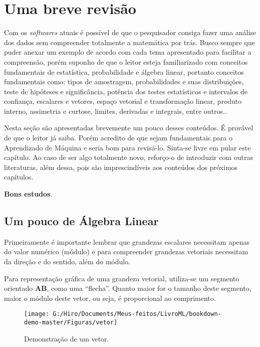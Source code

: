 \documentclass[
  openany]{book}
\begin{document}
\hypertarget{dicio}{%
\chapter{Uma breve revisão}\label{dicio}}

Com os \emph{softwares} atuais é possível de que o pesquisador consiga fazer uma análise dos dados sem compreender totalmente a matemática por trás. Busco sempre que puder anexar um exemplo de acordo com cada tema apresentado para facilitar a compreensão, porém suponho de que o leitor esteja familiarizado com conceitos fundamentais de estatística, probabilidade e álgebra linear, portanto conceitos fundamentais como: tipos de amostragem, probabilidades e suas distribuições, teste de hipóteses e significância, potência dos testes estatísticos e intervalos de confiança, escalares e vetores, espaço vetorial e transformação linear, produto interno, assimetria e curtose, limites, derivadas e integrais, entre outros..

Nesta seção são apresentadas brevemente um pouco desses conteúdos. É provável de que o leitor já saiba. Porém acredito de que sejam fundamentais para o Aprendizado de Máquina e seria bom para revisá-lo. Sinta-se livre em pular este capítulo. Ao caso de ser algo totalmente novo, reforço-o de introduzir com outras literaturas, além dessa, pois são imprescindíveis aos conteúdos dos próximos capítulos.

\textbf{Bons estudos}.

\hypertarget{um-pouco-de-uxe1lgebra-linear}{%
\section{Um pouco de Álgebra Linear}\label{um-pouco-de-uxe1lgebra-linear}}

Primeiramente é importante lembrar que grandezas escalares necessitam apenas do valor numérico (módulo) e para compreender grandezas vetoriais necessitam da direção e do sentido, além do módulo.

Para representação gráfica de uma grandeza vetorial, utiliza-se um segmento orientado \textbf{AB}, como uma ``flecha''. Quanto maior for o tamanho deste segmento, maior o módulo deste vetor, ou seja, é proporcional ao comprimento.

\begin{figure}

{\centering \texttt{[image: G:/Hiro/Documents/Meus-feitos/LivroML/bookdown-demo-master/Figuras/vetor]} 

}

\caption{Demonstração de um vetor.}\label{fig:vetor}
\end{figure}
\end{document}
